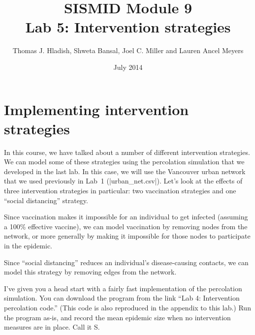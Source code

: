 \documentclass{article}
\begin{document}
\title{SISMID Module 9\\Lab 5: Intervention strategies}
\author{Thomas J. Hladish, Shweta Bansal, Joel C. Miller and Lauren Ancel Meyers}
\date{July 2014}
\maketitle


\section*{Implementing intervention strategies}

In this course, we have talked about a number of different intervention strategies. We can model some of these 
strategies using the percolation simulation that we developed in the last lab.  In this case, we will use
the Vancouver urban network that we used previously in Lab~1 (|urban_net.csv|).  Let's look at the effects of
three intervention strategies in particular: two vaccination strategies and one ``social distancing'' strategy.

Since vaccination makes it impossible for an individual to get infected (assuming a 100\% effective vaccine), we can
model vaccination by removing nodes from the network, or more generally by making it impossible for those nodes to participate in the epidemic.

Since ``social distancing'' reduces an individual's disease-causing contacts, we can model this strategy by
removing edges from the network.

I've given you a head start with a fairly fast implementation of the percolation simulation.  You can download the program 
from the link ``Lab 4: Intervention percolation code.''  (This code is also reproduced in the appendix to this lab.)  Run the program as-is,
and record the mean epidemic size when no intervention measures are in place.  Call it S.
\end{document}
